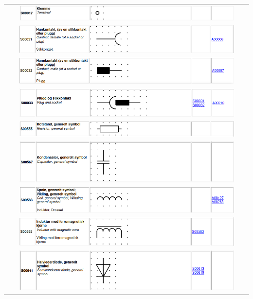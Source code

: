 \documentclass{article}
\begin{document}
\begin{center}
\begin{longtable}{c}
    \includegraphics[width=0.9\textwidth]{bilder/s00017.png}\\
    \includegraphics[width=0.9\textwidth]{bilder/s00031.png}\\
    \includegraphics[width=0.9\textwidth]{bilder/s00032.png}\\
    \includegraphics[width=0.9\textwidth]{bilder/s00033.png}\\
    \includegraphics[width=0.9\textwidth]{bilder/s00555.png}\\
    \includegraphics[width=0.9\textwidth]{bilder/s00567.png}\\
    \includegraphics[width=0.9\textwidth]{bilder/s00583.png}\\
    \includegraphics[width=0.9\textwidth]{bilder/s00585.png}\\
    \includegraphics[width=0.9\textwidth]{bilder/s00641.png}\\

\end{longtable}
\end{center}
\end{document}
